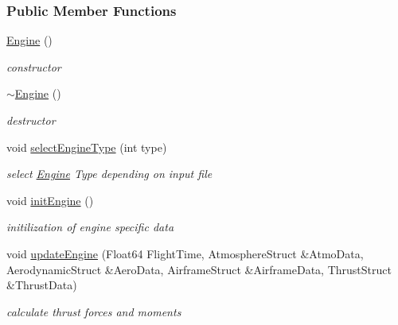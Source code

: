 \subsubsection*{Public Member Functions}
\begin{DoxyCompactItemize}
\item 
\mbox{\label{group___engine_a8c98683b0a3aa28d8ab72a8bcd0d52f2}} 
\hyperlink{group___engine_a8c98683b0a3aa28d8ab72a8bcd0d52f2}{Engine} ()
\begin{DoxyCompactList}\small\item\em constructor \end{DoxyCompactList}\item 
\mbox{\label{group___engine_a8ef7030a089ecb30bbfcb9e43094717a}} 
\hyperlink{group___engine_a8ef7030a089ecb30bbfcb9e43094717a}{$\sim$\+Engine} ()
\begin{DoxyCompactList}\small\item\em destructor \end{DoxyCompactList}\item 
void \hyperlink{group___engine_ac33371d6fff86c0c8e14495f10046d9a}{select\+Engine\+Type} (int type)
\begin{DoxyCompactList}\small\item\em select \hyperlink{group___engine_class_engine}{Engine} Type depending on input file \end{DoxyCompactList}\item 
\mbox{\label{group___engine_aca6cc0dc7d537295123630a219142337}} 
void \hyperlink{group___engine_aca6cc0dc7d537295123630a219142337}{init\+Engine} ()
\begin{DoxyCompactList}\small\item\em initilization of engine specific data \end{DoxyCompactList}\item 
void \hyperlink{group___engine_a9e16100ffd33cf8ec632257795c03865}{update\+Engine} (Float64 Flight\+Time, Atmosphere\+Struct \&Atmo\+Data, Aerodynamic\+Struct \&Aero\+Data, Airframe\+Struct \&Airframe\+Data, Thrust\+Struct \&Thrust\+Data)
\begin{DoxyCompactList}\small\item\em calculate thrust forces and moments \end{DoxyCompactList}\end{DoxyCompactItemize}


